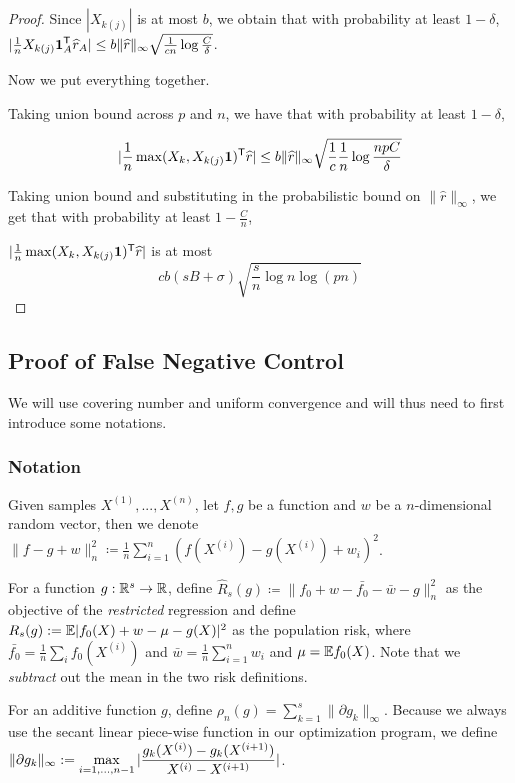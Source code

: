\begin{proof}
Since $|X_{k(j)}|$ is at most $b$, we obtain that with probability at least $1-\delta$, $| \frac{1}{n} X_{k(j)} \mbox{\boldmath $1$}_A^{\mathsf{T}} \widehat{r}_A| \leq b\| \widehat{r} \|_\infty \sqrt{ \frac{1}{cn} \log \frac{C}{\delta}}$.

Now we put everything together.

Taking union bound across $p$ and $n$, we have that with probability at least $1-\delta$, 

\[
| \frac{1}{n} \max(X_k, X_{k(j)}\mbox{\boldmath $1$})^{\mathsf{T}} \widehat{r}| \leq b \|\widehat{r}\|_\infty \sqrt{ \frac{1}{c} \frac{1}{n} \log \frac{np C }{\delta}}
\]

Taking union bound and substituting in the probabilistic bound on $\|\hat{r}\|_\infty$, we get that with probability at least $1-\frac{C}{n}$,

$| \frac{1}{n} \max(X_k, X_{k(j)}\mbox{\boldmath $1$})^{\mathsf{T}} \widehat{r}|$ is at most 
\[
 c b (sB + \sigma) \sqrt{ \frac{s}{n} \log n \log (pn) }
\]

\end{proof}

 
 
 
 
 
 \subsection{Proof of False Negative Control}
 \label{sec:false_negative_proof}
 
 We will use covering number and uniform convergence and will thus need to first introduce some notations. 
 \subsubsection{Notation} 

 Given samples $X^{(1)},...,X^{(n)}$, let $f, g$ be a function and $w$ be a $n$-dimensional random vector, then we denote $\| f - g + w \|_n^2 \coloneqq \frac{1}{n} \sum_{i=1}^n ( f(X^{(i)}) - g(X^{(i)}) + w_i )^2$.

For a function $g : {\mathbb R}^s \rightarrow {\mathbb R}$, define $\hat{R}_s(g) \coloneqq \| f_0 + w - \bar{f_0} - \bar{w} - g \|_n^2$ as the objective of the \emph{restricted} regression and define $R_s(g) := {\mathbb E} | f_0(X)  + w - \mu - g(X) |^2$ as the population risk, where $\bar{f_0} = \frac{1}{n} \sum_i f_0(X^{(i)})$ and $\bar{w} = \frac{1}{n}\sum_{i=1}^n w_i $ and $\mu = {\mathbb E} f_0(X)$. Note that we \emph{subtract} out the mean in the two risk definitions.

For an additive function $g$, define $\rho_n(g) = \sum_{k=1}^s \| \partial g_k \|_\infty$. Because we always use the secant linear piece-wise function in our optimization program, we define $\displaystyle \| \partial g_k\|_\infty := \max_{i=1,...,n-1} |\frac{ g_k(X^{(i)}) - g_k(X^{(i+1)})}{ X^{(i)} - X^{(i+1)}}|$.

